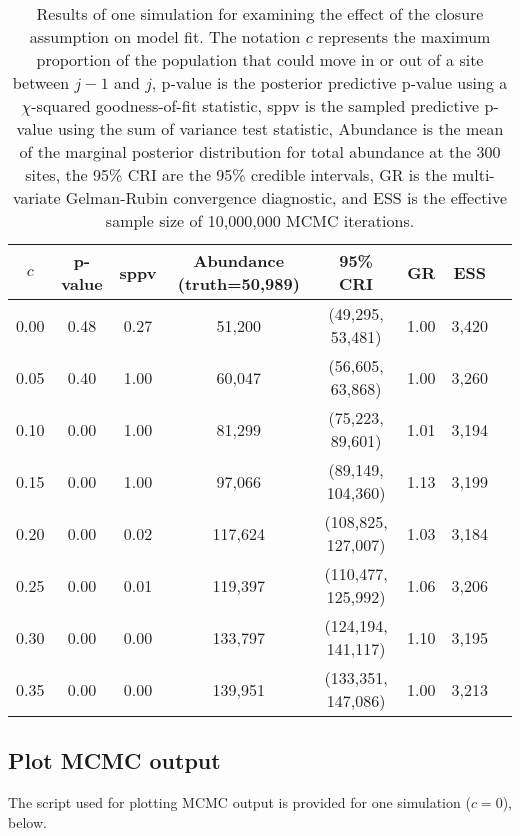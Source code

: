 \documentclass[12pt,letterpaper,final]{article}\usepackage[]{graphicx}\usepackage[]{color}
\begin{document}
\begin{table}[ht]
  \centering
  \begin{tabular}{cccccccc}
    \hline \hline
    $c$ & p-value & sppv & Abundance (truth=50,989) & 95\% CRI & GR & ESS \\
    \hline
    0.00 & 0.48 & 0.27 & 51,200 & (49,295, 53,481) & 1.00 & 3,420 \\
    0.05 & 0.40 & 1.00 & 60,047 & (56,605, 63,868) & 1.00 & 3,260 \\
    0.10 & 0.00 & 1.00 & 81,299 & (75,223, 89,601) & 1.01 & 3,194 \\
    0.15 & 0.00 & 1.00 & 97,066 & (89,149, 104,360) & 1.13 & 3,199 \\
    0.20 & 0.00 & 0.02 & 117,624 & (108,825, 127,007) & 1.03 & 3,184 \\
    0.25 & 0.00 & 0.01 & 119,397 & (110,477, 125,992) & 1.06 & 3,206 \\
    0.30 & 0.00 & 0.00 & 133,797 & (124,194, 141,117) & 1.10 & 3,195 \\
    0.35 & 0.00 & 0.00 & 139,951 & (133,351, 147,086) & 1.00 & 3,213 \\
    \hline
  \end{tabular}
  \caption[Model checking results]{Results of one simulation for
    examining the effect of
    the closure assumption on model fit. The notation $c$
    represents the maximum proportion of the population that could
    move in or out of a site between $j-1$ and $j$, p-value  is the
    posterior predictive
    p-value using a $\chi$-squared goodness-of-fit statistic, sppv
    is the sampled predictive p-value using the sum of variance
    test statistic, Abundance is the mean of the marginal
    posterior distribution for total abundance at the 300 sites,
    the 95\% CRI are the 95\% credible intervals, GR is the
    multi-variate Gelman-Rubin convergence diagnostic, and ESS is
    the effective sample size of 10,000,000 MCMC iterations.}
  \label{tab:results}
\end{table}


\subsection{Plot MCMC output}
The script used for plotting MCMC output is provided for one
simulation ($c=0$), below.
\end{document}
